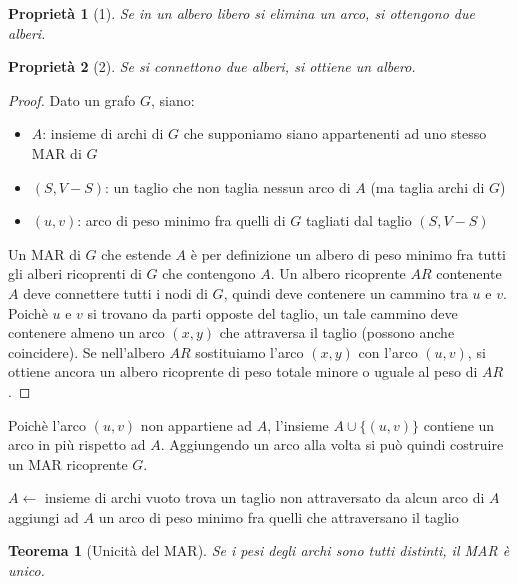 \documentclass[11pt]{book}
\newtheorem*{theorem}{Teorema}
\newtheorem*{proprietà}{Proprietà}
\begin{document}
\begin{proprietà}[1]
    Se in un albero libero si elimina un arco, si ottengono due alberi.
\end{proprietà}
\begin{proprietà}[2]
    Se si connettono due alberi, si ottiene un albero.
\end{proprietà}
\begin{proof}
    Dato un grafo $G$, siano:
    \begin{itemize}
        \item $A$: insieme di archi di $G$ che supponiamo siano appartenenti ad uno stesso MAR di $G$
        \item $(S,V-S)$: un taglio che non taglia nessun arco di $A$ (ma taglia archi di $G$)
        \item $(u,v)$: arco di peso minimo fra quelli di $G$ tagliati dal taglio $(S,V-S)$
    \end{itemize}
    Un MAR di $G$ che estende $A$ è per definizione un albero di peso minimo fra tutti gli alberi ricoprenti  di $G$ che 
    contengono $A$. Un albero ricoprente $AR$ contenente $A$ deve connettere tutti i nodi di $G$, quindi deve contenere 
    un cammino tra $u$ e $v$. Poichè $u$ e $v$ si trovano da parti opposte del taglio, un tale cammino deve contenere almeno 
    un arco $(x,y)$ che attraversa il taglio (possono anche coincidere). Se nell'albero $AR$ sostituiamo l'arco $(x,y)$
    con l'arco $(u,v)$, si ottiene ancora un albero ricoprente di peso totale minore o uguale al peso di $AR$. 
\end{proof}
Poichè l'arco $(u,v)$ non appartiene ad $A$, l'insieme $A\cup \{(u,v)\}$ contiene un arco in più rispetto ad $A$. Aggiungendo 
un arco alla volta si può quindi costruire un MAR ricoprente $G$.
\begin{algorithm}
    \caption{TROVA MAR(G)}
    \begin{algorithmic}
        \State $A\gets$ insieme di archi vuoto
            \State trova un taglio non attraversato da alcun arco di $A$
            \State aggiungi ad $A$ un arco di peso minimo fra quelli che attraversano il taglio 
        \EndWhile
    \end{algorithmic}
\end{algorithm}
\begin{theorem}[Unicità del MAR]
    Se i pesi degli archi sono tutti distinti, il MAR è unico.
\end{theorem}
\end{document}
